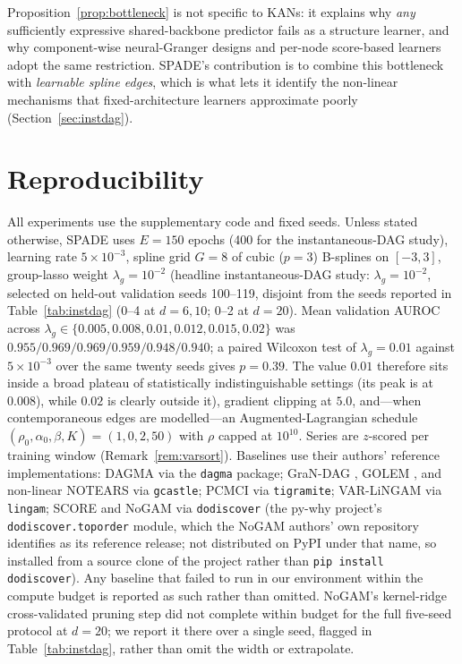 \begin{remark}
Proposition~\ref{prop:bottleneck} is not specific to KANs: it explains why
\emph{any} sufficiently expressive shared-backbone predictor fails as a structure
learner, and why component-wise neural-Granger designs
\citep{Tank2021,GCKAN2024} and per-node score-based learners
\citep{zheng2020sparse,lachapelle2020grandag} adopt the same restriction. SPADE's
contribution is to combine this bottleneck with \emph{learnable spline edges},
which is what lets it identify the non-linear mechanisms that fixed-architecture
learners approximate poorly (Section~\ref{sec:instdag}).
\end{remark}

\section{Reproducibility}
\label{app:repro}

All experiments use the supplementary code and fixed seeds. Unless stated otherwise,
SPADE uses $E{=}150$ epochs (400 for the instantaneous-DAG study), learning rate
$5\times10^{-3}$, spline grid $G{=}8$ of cubic ($p{=}3$) B-splines on
$[-3,3]$, group-lasso weight $\lambda_g{=}10^{-2}$ (headline instantaneous-DAG
study: $\lambda_g{=}10^{-2}$, selected on held-out validation seeds
100--119, disjoint from the seeds reported in Table~\ref{tab:instdag} (0--4 at
$d{=}6,10$; 0--2 at $d{=}20$). Mean validation AUROC across
$\lambda_g\in\{0.005,0.008,0.01,0.012,0.015,0.02\}$ was
$0.955/0.969/0.969/0.959/0.948/0.940$; a paired Wilcoxon test of
$\lambda_g=0.01$ against $5\times10^{-3}$ over the same twenty seeds gives
$p=0.39$. The value $0.01$ therefore sits inside a broad plateau of statistically
indistinguishable settings (its peak is at $0.008$), while $0.02$ is clearly
outside it),
gradient clipping at $5.0$,
and---when contemporaneous edges are modelled---an Augmented-Lagrangian schedule
$(\rho_0,\alpha_0,\beta,K)=(1,0,2,50)$ with $\rho$ capped at $10^{10}$. Series are
$z$-scored per training window (Remark~\ref{rem:varsort}). Baselines use their
authors' reference implementations: DAGMA \citep{Bello2022} via the
\texttt{dagma} package; GraN-DAG \citep{lachapelle2020grandag}, GOLEM
\citep{ng2020golem}, and non-linear NOTEARS \citep{zheng2020sparse} via
\texttt{gcastle}; PCMCI \citep{Runge2019} via \texttt{tigramite}; VAR-LiNGAM
\citep{Hyvarinen2010} via \texttt{lingam}; SCORE \citep{rolland2022score} and
NoGAM \citep{montagna2023nogam} via \texttt{dodiscover} (the py-why project's
\texttt{dodiscover.toporder} module, which the NoGAM authors' own repository
identifies as its reference release; not distributed on PyPI under that name,
so installed from a source clone of the project rather than \texttt{pip
install dodiscover}). Any baseline that failed to run in our
environment within the compute budget is reported as such rather than omitted.
NoGAM's kernel-ridge cross-validated pruning step did not complete within
budget for the full five-seed protocol at $d{=}20$; we report it there over a
single seed, flagged in Table~\ref{tab:instdag}, rather than omit the width or
extrapolate.

